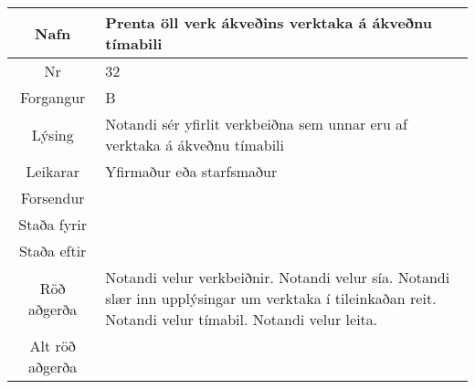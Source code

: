 \documentclass[a4paper]{article}
\begin{document}
\begin{tabular}{|c|p{10cm}|}
\hline
Nafn&Prenta öll verk ákveðins verktaka á ákveðnu tímabili\\
\hline
Nr&32\\
\hline
Forgangur&B\\
\hline
Lýsing&Notandi sér yfirlit verkbeiðna sem unnar eru af verktaka á ákveðnu tímabili\\
\hline
Leikarar&Yfirmaður eða starfsmaður\\
\hline
Forsendur&\\
\hline
Staða fyrir&\\
\hline
Staða eftir&\\
\hline
Röð aðgerða&Notandi velur verkbeiðnir. Notandi velur sía. Notandi slær inn upplýsingar um verktaka í tileinkaðan reit. Notandi velur tímabil. Notandi velur leita.\\
\hline
Alt röð aðgerða&\\
\hline
\end{tabular}
\end{document}
